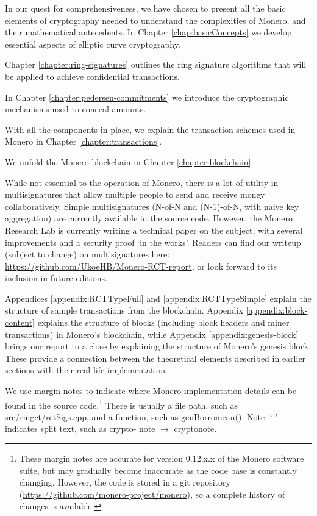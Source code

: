 In our quest for comprehensiveness, we have chosen to present all the basic elements of cryptography needed to understand the complexities of Monero, and their mathematical antecedents. In Chapter \ref{chap:basicConcepts} we develop essential aspects of elliptic curve cryptography.

Chapter \ref{chapter:ring-signatures} outlines the ring signature algorithms that will be applied to achieve confidential transactions.

In Chapter \ref{chapter:pedersen-commitments} we introduce the cryptographic mechanisms used to conceal amounts.

With all the components in place, we explain the transaction schemes used in Monero in Chapter \ref{chapter:transactions}.

We unfold the Monero blockchain in Chapter \ref{chapter:blockchain}.

While not essential to the operation of Monero, there is a lot of utility in multisignatures that allow multiple people to send and receive money collaboratively. Simple multisignatures (N-of-N and (N-1)-of-N, with naive key aggregation) are currently available in the source code. However, the Monero Research Lab is currently writing a technical paper on the subject, with several improvements and a security proof `in the works'. Readers can find our writeup (subject to change) on multisignatures here: \url{https://github.com/UkoeHB/Monero-RCT-report}, or look forward to its inclusion in future editions. %

Appendices \ref{appendix:RCTTypeFull} and \ref{appendix:RCTTypeSimple} explain the structure of sample transactions from the blockchain. Appendix \ref{appendix:block-content} explains the structure of blocks (including block headers and miner transactions) in Monero's blockchain, while Appendix \ref{appendix:genesis-block} brings our report to a close by explaining the structure of Monero's genesis block. These provide a connection between the theoretical elements described in earlier sections with their real-life implementation.

We use margin notes to indicate where Monero implementation details can be found in the source code.\footnote{These margin notes are accurate for version 0.12.x.x of the Monero software suite, but may gradually become inaccurate as the code base is constantly changing. However, the code is stored in a git repository (\url{https://github.com/monero-project/monero}), so a complete history of changes is available.} There is usually a file path, such as src/ringct/rctSigs.cpp, and a function, such as \(\textrm{genBorromean()}\). Note: `-' indicates split text, such as crypto- note $\rightarrow$ cryptonote.

